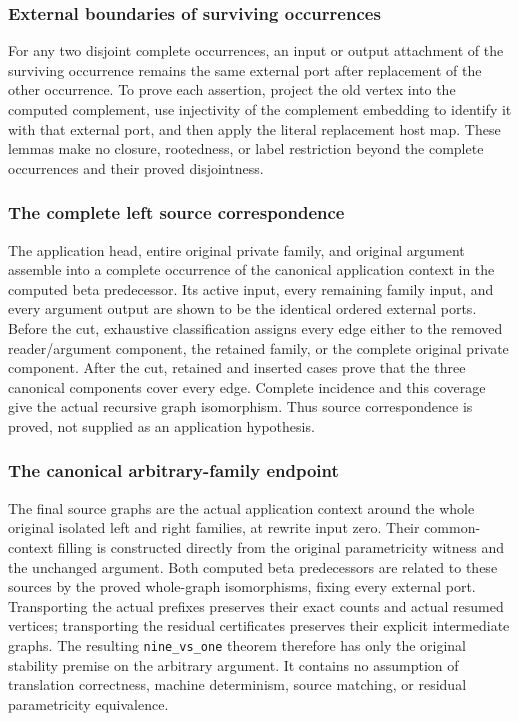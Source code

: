 \subsubsection{External boundaries of surviving occurrences}
For any two disjoint complete occurrences, an input or output attachment of the surviving occurrence remains the same external port after replacement of the other occurrence.  To prove each assertion, project the old vertex into the computed complement, use injectivity of the complement embedding to identify it with that external port, and then apply the literal replacement host map.  These lemmas make no closure, rootedness, or label restriction beyond the complete occurrences and their proved disjointness.

\subsubsection{The complete left source correspondence}
The application head, entire original private family, and original argument assemble into a complete occurrence of the canonical application context in the computed beta predecessor.  Its active input, every remaining family input, and every argument output are shown to be the identical ordered external ports.  Before the cut, exhaustive classification assigns every edge either to the removed reader/argument component, the retained family, or the complete original private component.  After the cut, retained and inserted cases prove that the three canonical components cover every edge.  Complete incidence and this coverage give the actual recursive graph isomorphism.  Thus source correspondence is proved, not supplied as an application hypothesis.

\subsubsection{The canonical arbitrary-family endpoint}
The final source graphs are the actual application context around the whole original isolated left and right families, at rewrite input zero.  Their common-context filling is constructed directly from the original parametricity witness and the unchanged argument.  Both computed beta predecessors are related to these sources by the proved whole-graph isomorphisms, fixing every external port.  Transporting the actual prefixes preserves their exact counts and actual resumed vertices; transporting the residual certificates preserves their explicit intermediate graphs.  The resulting \texttt{nine\_vs\_one} theorem therefore has only the original stability premise on the arbitrary argument.  It contains no assumption of translation correctness, machine determinism, source matching, or residual parametricity equivalence.



